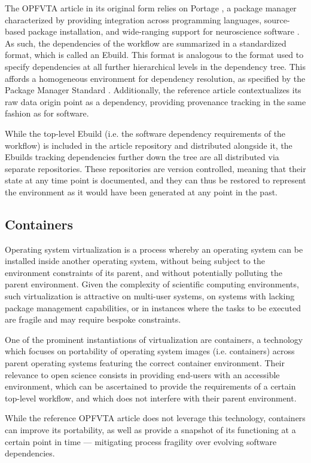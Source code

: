 The OPFVTA article in its original form relies on Portage \supercite{portage}, a package manager characterized by providing integration across programming languages, source-based package installation, and wide-ranging support for neuroscience software \supercite{ng}.
As such, the dependencies of the workflow are summarized in a standardized format, which is called an Ebuild.
This format is analogous to the format used to specify dependencies at all further hierarchical levels in the dependency tree.
This affords a homogeneous environment for dependency resolution, as specified by the Package Manager Standard \supercite{pms}.
Additionally, the reference article contextualizes its raw data origin point as a dependency, providing provenance tracking in the same fashion as for software.

While the top-level Ebuild (i.e. the software dependency requirements of the workflow) is included in the article repository and distributed alongside it, the Ebuilds tracking dependencies further down the tree are all distributed via separate repositories.
These repositories are version controlled, meaning that their state at any time point is documented, and they can thus be restored to represent the environment as it would have been generated at any point in the past.

\subsection{Containers}

Operating system virtualization is a process whereby an operating system can be installed inside another operating system, without being subject to the environment constraints of its parent, and without potentially polluting the parent environment.
Given the complexity of scientific computing environments, such virtualization is attractive on multi-user systems, on systems with lacking package management capabilities, or in instances where the tasks to be executed are fragile and may require bespoke constraints.

One of the prominent instantiations of virtualization are containers, a technology which focuses on portability of operating system images (i.e. containers) across parent operating systems featuring the correct container environment.
Their relevance to open science consists in providing end-users with an accessible environment, which can be ascertained to provide the requirements of a certain top-level workflow, and which does not interfere with their parent environment.

While the reference OPFVTA article does not leverage this technology, containers can improve its portability, as well as provide a snapshot of its functioning at a certain point in time — mitigating process fragility over evolving software dependencies.
